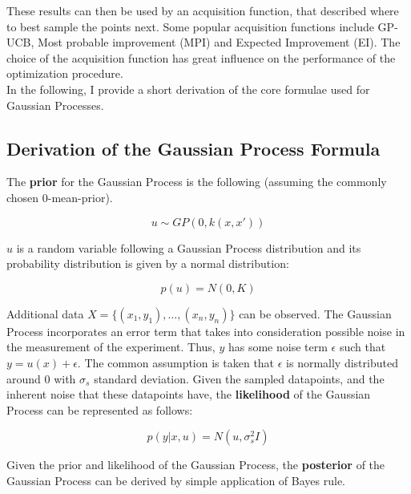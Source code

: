 These results can then be used by an acquisition function, that described where to best sample the points next.
Some popular acquisition functions include GP-UCB, Most probable improvement (MPI) and Expected Improvement (EI).
The choice of the acquisition function has great influence on the performance of the optimization procedure.\\

In the following, I provide a short derivation of the core formulae used for Gaussian Processes.

\subsection{Derivation of the Gaussian Process Formula}
The \textbf{prior} for the Gaussian Process is the following (assuming the commonly chosen 0-mean-prior).

\begin{equation}
u \sim GP(0, k(x, x'))
\end{equation}

$u$ is a random variable following a Gaussian Process distribution and its probability distribution is given by a normal distribution:

\begin{equation}
p(u) = N ( 0, K )
\end{equation}

Additional data $ X = \{ (x_1, y_1), \ldots, (x_n, y_n) \} $ can be observed.
The Gaussian Process incorporates an error term that takes into consideration possible noise in the measurement of the experiment.
Thus, $y$ has some noise term $\epsilon$ such that $y = u(x) + \epsilon$.
The common assumption is taken that $\epsilon$ is normally distributed around $0$ with $\sigma_s$ standard deviation.
Given the sampled datapoints, and the inherent noise that these datapoints have, the \textbf{likelihood} of the Gaussian Process can be represented as follows:

\begin{equation}
p(y | x, u) = N (u, \sigma_s^2 I)
\end{equation}


Given the prior and likelihood of the Gaussian Process, the \textbf{posterior} of the Gaussian Process can be derived by simple application of Bayes rule.

